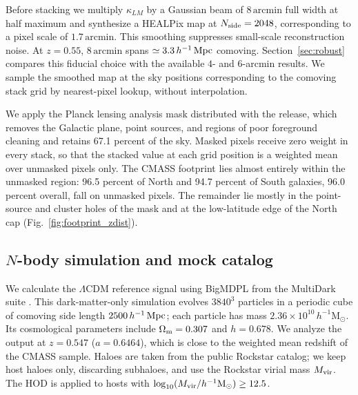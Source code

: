 Before stacking we multiply $\kappa_{LM}$ by a Gaussian beam of
$8\,\mathrm{arcmin}$ full width at half maximum and synthesize a HEALPix map
\citep{Gorski2005} at $N_{\rm side}=2048$, corresponding to a pixel scale of
$1.7\,\mathrm{arcmin}$. This smoothing suppresses small-scale reconstruction
noise. At $z=0.55$, $8\,\mathrm{arcmin}$ spans
$\simeq3.3\,h^{-1}\,{\rm Mpc}$ comoving. Section~\ref{sec:robust} compares this
fiducial choice with the available $4$- and $6$-arcmin results. We sample the
smoothed map at the sky positions
corresponding to the comoving stack grid by nearest-pixel lookup, without
interpolation.

We apply the Planck lensing analysis mask distributed with the release,
which removes the Galactic plane, point sources, and regions of poor
foreground cleaning and retains 67.1 percent of the sky. Masked pixels
receive zero weight in every stack, so that the stacked value at each grid
position is a weighted mean over unmasked pixels only. The CMASS footprint
lies almost entirely within the unmasked region: 96.5 percent of North and
94.7 percent of South galaxies, 96.0 percent overall, fall on unmasked
pixels. The remainder lie mostly in the point-source and cluster holes of the
mask and at the low-latitude edge of the North cap
(Fig.~\ref{fig:footprint_zdist}).

\subsection{$N$-body simulation and mock catalog}
\label{sec:sim}

We calculate the $\Lambda$CDM reference signal using BigMDPL from the
MultiDark suite \citep{Klypin2016, Riebe2013}. This dark-matter-only simulation
evolves $3840^{3}$ particles in a periodic cube of comoving side length
$2500\,h^{-1}\,{\rm Mpc}$; each particle has mass
$2.36\times10^{10}\,h^{-1}\mathrm{M}_{\odot}$. Its cosmological parameters
include $\Omega_{\rm m}=0.307$ and $h=0.678$. We analyze the output at
$z=0.547$ ($a=0.6464$), which is close to the weighted mean redshift of the
CMASS sample. Haloes
are taken from the public Rockstar catalog; we keep host haloes only,
discarding subhaloes, and use the Rockstar virial mass $M_{\rm vir}$. The
HOD is applied to hosts with
$\log_{10}(M_{\rm vir}/h^{-1}\mathrm{M}_{\odot})\geq12.5$.

